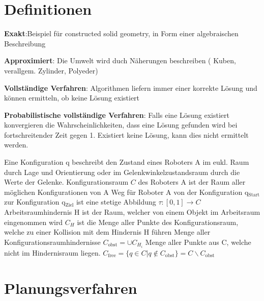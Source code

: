 \section{Definitionen}
\begin{compactitem}
    \item \textbf{Exakt}:Beispiel für constructed solid geometry, in Form einer
    algebraischen Beschreibung
    \item \textbf{Approximiert}: Die Umwelt wird duch Näherungen beschreiben (
    Kuben, verallgem. Zylinder, Polyeder)
\end{compactitem}

\begin{compactitem}
    \item \textbf{Vollständige Verfahren}: Algorithmen liefern immer einer korrekte
    Lösung und können ermitteln, ob keine Lösung existiert
    \item \textbf{Probabilistische vollständige Verfahren}: Falls eine Lösung
    existiert konvergieren die Wahrscheinlichkeiten, dass eine Lösung gefunden
    wird bei fortschreitender Zeit gegen 1. Existiert keine Lösung, kann dies nicht
    ermittelt werden.
\end{compactitem}
Eine Konfiguration q beschreibt den Zustand eines Roboters A im eukl. Raum durch Lage und Orientierung
oder im Gelenkwinkelzustandsraum durch die Werte der Gelenke.
Konfigurationsraum $C$ des Roboters A ist der Raum aller möglichen Konfigurationen von A
Weg für Roboter A von der Konfiguration q$_\text{Start}$ zur Konfiguration q$_\text{Ziel}$ ist eine
stetige Abbildung $\tau:[0,1] \rightarrow C$
Arbeitsraumhindernis H ist der Raum, welcher von einem Objekt im Arbeitsraum eingenommen wird
$C_H$ ist die Menge aller Punkte des Konfigurationsraum, welche zu einer Kollision mit dem Hindernis
H führen
Menge aller Konfigurationsraumhindernisse $C_\text{obst} = \cup C_{H_i}$
Menge aller Punkte aus C, welche nicht im Hindernisraum liegen.
$C_\text{free} =  \{ q \in C | q \notin C_\text{obst}\} = C \backslash C_\text{obst}$

\section{Planungsverfahren}
